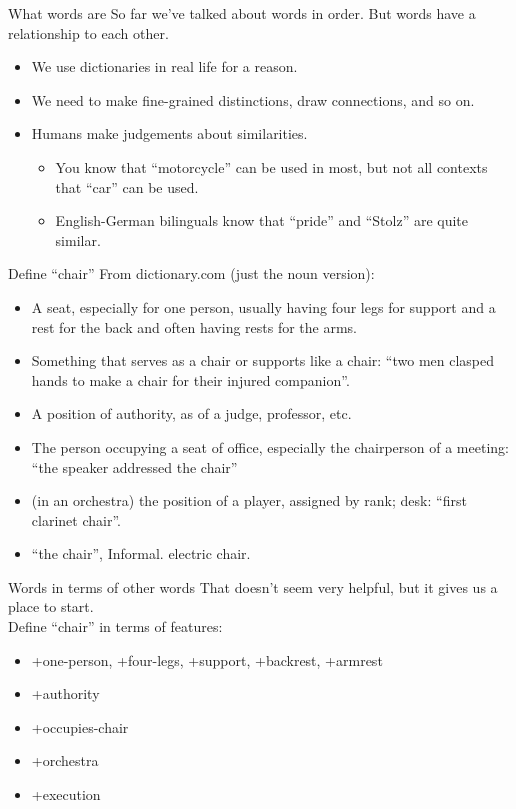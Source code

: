\documentclass[xcolor=pdftex,x11names,table,hyperref]{beamer}
\begin{document}
\begin{frame}{What words are}
  So far we've talked about words in order.  But words have a
  relationship to each other.
  \begin{itemize}
  \item We use dictionaries in real life for a reason.
  \item We need to make fine-grained distinctions, draw connections,
    and so on.
  \item Humans make judgements about similarities.  
    \begin{itemize}
    \item You know that ``motorcycle'' can be used in most, but not all
      contexts that ``car'' can be used.
    \item English-German bilinguals know that ``pride'' and ``Stolz'' are quite similar.
    \end{itemize}
  \end{itemize}
\end{frame}


\begin{frame}{Define ``chair''}
  From dictionary.com (just the noun version):\pause
  \begin{itemize}
  \item A seat, especially for one person, usually having four legs
    for support and a rest for the back and often having rests for the arms.
  \item Something that serves as a chair or supports like a chair:
    ``two men clasped hands to make a chair for their injured companion''.
  \item A position of authority, as of a judge, professor, etc.
  \item The person occupying a seat of office, especially the chairperson
    of a meeting: ``the speaker addressed the chair''
  \item (in an orchestra) the position of a player, assigned by rank; desk:
    ``first clarinet chair''.
  \item ``the chair'', Informal. electric chair.
  \end{itemize}
\end{frame}

\begin{frame}{Words in terms of other words}
  That doesn't seem very helpful, but it gives us a place to start.\\
  Define ``chair'' in terms of features:
  \begin{itemize}
  \item +one-person, +four-legs, +support, +backrest, +armrest
  \item +authority
  \item +occupies-chair
  \item +orchestra
  \item +execution
  \end{itemize}
\end{frame}
\end{document}
